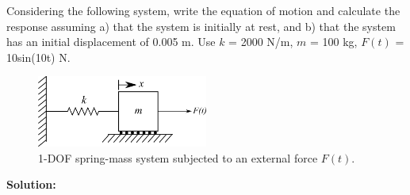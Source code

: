 \documentclass[12pt,letter]{article}
\begin{document}
\begin{example}
	Considering the following system, write the equation of motion and calculate the response assuming a) that the system is initially at rest, and b) that the system has an initial displacement of 0.005 m. Use $k$ = 2000 N/m, $m$ = 100 kg, $F(t)$ = 10sin(10t) N.
	\begin{figure}[H]
		\centering
		\includegraphics[width=0.5\textwidth]{../figures/1-DOF-spring_mass_horizontal_forced.png}
		\caption{1-DOF spring-mass system subjected to an external force $F(t)$.}
	\end{figure}
	\noindent\textbf{Solution:} 


\end{example}
\end{document}
